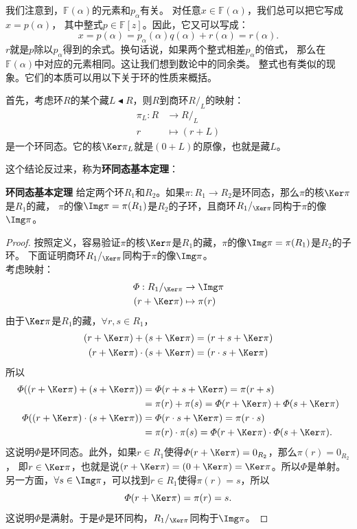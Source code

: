 \documentclass[12pt,UTF8]{ctexbook}
\begin{document}
\begin{appendix}
我们注意到，$\mathbb{F}(\alpha)$的元素和$p_\alpha$有关。
对任意$x \in \mathbb{F}(\alpha)$，我们总可以把它写成$x = p(\alpha)$，
其中整式$p \in\mathbb{F}[z]$。因此，它又可以写成：
$$ x = p(\alpha) = p_\alpha(\alpha)q(\alpha) + r(\alpha) = r(\alpha).$$
$r$就是$p$除以$p_\alpha$得到的余式。换句话说，如果两个整式相差$p_\alpha$的倍式，
那么在$\mathbb{F}(\alpha)$中对应的元素相同。这让我们想到数论中的同余类。
整式也有类似的现象。它们的本质可以用以下关于环的性质来概括。

首先，考虑环$R$的某个藏$L \blacktriangleleft R$，则$R$到商环$R /_L$的映射：
\begin{align*}
    \pi_L : R &\rightarrow R /_L  \\
    r &\mapsto (r + L) 
\end{align*}
是一个环同态。它的核$\Ker \pi_L$就是$(0 + L)$的原像，也就是藏$L$。

这个结论反过来，称为\textbf{环同态基本定理}：
\begin{pp}\textbf{环同态基本定理 }\label{pp:9_1}
    给定两个环$R_1$和$R_2$。如果$\pi: R_1 \rightarrow R_2$是环同态，那么$\pi$的核$\Ker \pi$是$R_1$的藏，
    $\pi$的像$\Img \pi = \pi (R_1)$是$R_2$的子环，且商环$R_1/_{\Ker \pi}$同构于$\pi$的像$\Img \pi$。
\end{pp}
\begin{proof} %
    按照定义，容易验证$\pi$的核$\Ker \pi$是$R_1$的藏，$\pi$的像$\Img \pi = \pi (R_1)$是$R_2$的子环。
    下面证明商环$R_1/_{\Ker \pi}$同构于$\pi$的像$\Img \pi$。\\
    考虑映射：
    \begin{align*}
        \varPhi : R_1/_{\Ker \pi} &\rightarrow \Img \pi  \\
        (r + \Ker \pi) &\mapsto \pi(r)  
    \end{align*}
    由于$\Ker \pi$是$R_1$的藏，$\forall r, s \in R_1$，
    \begin{align*}
        (r + \Ker \pi) + (s + \Ker \pi) &= (r + s + \Ker \pi)  \\
        (r + \Ker \pi) \cdot (s + \Ker \pi) &= (r \cdot s + \Ker \pi)  
    \end{align*}
    所以
    \begin{align*}
        \varPhi((r + \Ker \pi) + (s + \Ker \pi)) &= \varPhi(r + s + \Ker \pi) = \pi(r + s)   \\
        &= \pi(r) + \pi (s) = \varPhi(r + \Ker \pi) + \varPhi(s + \Ker \pi)  \\
        \varPhi((r + \Ker \pi) \cdot (s + \Ker \pi)) &= \varPhi(r \cdot s + \Ker \pi) = \pi(r \cdot s)   \\
        &= \pi(r) \cdot \pi (s) = \varPhi(r + \Ker \pi) \cdot \varPhi(s + \Ker \pi).  
    \end{align*}
    这说明$\varPhi$是环同态。此外，如果$r \in R_1$使得$\varPhi(r + \Ker \pi) = 0_{R_2}$，那么$\pi(r) = 0_{R_2}$，
    即$r \in \Ker \pi$，也就是说$(r + \Ker \pi) = (0 + \Ker \pi) = \Ker \pi$。所以$\varPhi$是单射。\\
    另一方面，$\forall s \in \Img \pi$，可以找到$r \in R_1$使得$\pi(r) = s$，所以
    $$ \varPhi(r + \Ker \pi) = \pi(r) = s.$$
    这说明$\varPhi$是满射。于是$\varPhi$是环同构，$R_1/_{\Ker \pi}$同构于$\Img \pi$。
    

\end{proof}
\end{appendix}
\end{document}
